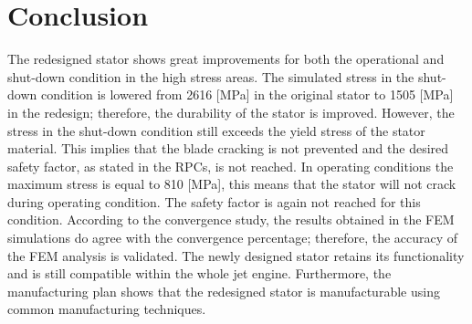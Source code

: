 \section{Conclusion}
\label{Chap:Conclusion}
The redesigned stator shows great improvements for both the operational and shut-down condition in the high stress areas. The simulated stress in the shut-down condition is lowered from 2616 [MPa] in the original stator to 1505 [MPa] in the redesign; therefore, the durability of the stator is improved. However, the stress in the shut-down condition still exceeds the yield stress of the stator material. This implies that the blade cracking is not prevented and the desired safety factor, as stated in the RPCs, is not reached. In operating conditions the maximum stress is equal to 810 [MPa], this means that the stator will not crack during operating condition. The safety factor is again not reached for this condition. According to the convergence study, the results obtained in the FEM simulations do agree with the convergence percentage; therefore, the accuracy of the FEM analysis is validated. The newly designed stator retains its functionality and is still compatible within the whole jet engine. Furthermore, the manufacturing plan shows that the redesigned stator is manufacturable using common manufacturing techniques. 

